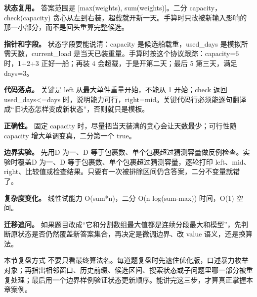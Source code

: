 \textbf{状态复用。} 答案范围是 [max(weights), sum(weights)]。二分 capacity，check(capacity) 贪心从左到右装，超载就开新一天。手算时只改被新输入影响的那一小部分，而不是回头重算完整候选。

\textbf{指针和字段。} 状态字段要能说清：capacity 是候选船载重，used\_days 是模拟所需天数，current\_load 是当天已装重量。手算时按这个协议跟踪：capacity=6 时，1+2+3 正好一船；再装 4 会超载，于是开第二天；最后 5 第三天，满足 days=3。

\textbf{代码落点。} 关键是 left 从最大单件重量开始，不能从 1 开始；check 返回 used\_days<=days 时，说明能力可行，right=mid。关键代码行必须能逐句翻译成“旧状态怎样变成新状态”，否则就只是模板。

\textbf{正确性。} 固定 capacity 时，尽量把当天装满的贪心会让天数最少；可行性随 capacity 增大单调变真，二分第一个 true。

\textbf{边界实验。} 先用D 为一、D 等于包裹数、单个包裹超过猜测容量做反例检查。实验时覆盖D 为一、D 等于包裹数、单个包裹超过猜测容量，逐轮打印 left、mid、right、比较值或检查结果。只要有一次被排除区间仍含答案，二分不变量就错了。

\textbf{复杂度变化。} 线性试能力 O(sum*n)，二分 O(n log(sum-max)) 时间，O(1) 空间。

\textbf{迁移追问。} 如果题目改成“它和分割数组最大值都是连续分段最大和模型”，先判断原状态是否仍然覆盖新答案集合，再决定是微调边界、改 value 语义，还是换算法。

\begin{principlebox}{本节复盘方式}
不要只看最终算法名。每道题复盘时先遮住优化版，口述暴力枚举对象；再指出相邻窗口、历史前缀、候选区间、搜索状态或子问题里哪一部分被重复处理；最后用一个边界样例验证状态更新顺序。能讲完这三步，才算真正掌握本章案例。
\end{principlebox}

